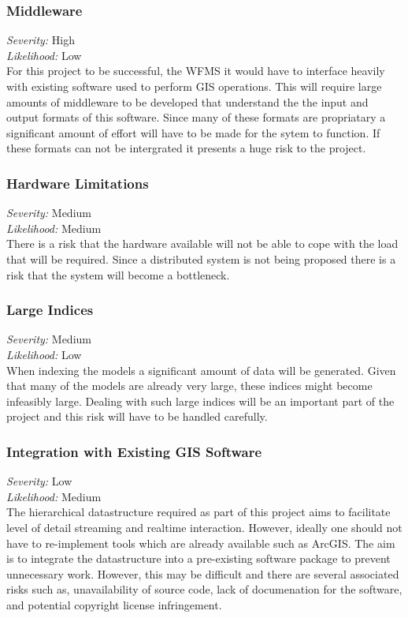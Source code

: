 \documentclass[12pt,a4paper]{article}
\begin{document}
\subsubsection*{Middleware}
\noindent \textit{Severity: } High \\
\noindent \textit{Likelihood: } Low \\
For this project to be successful, the WFMS it would have to interface
heavily with existing software used to perform GIS operations. This will
require large amounts of middleware to be developed that understand the
the input and output formats of this software. Since many of these
formats are propriatary a significant amount of effort will have to
be made for the sytem to function. If these formats can not be intergrated
it presents a huge risk to the project.
\subsubsection*{Hardware Limitations}
\noindent \textit{Severity: } Medium \\
\noindent \textit{Likelihood: } Medium \\
There is a risk that the hardware available will not be able to cope
with the load that will be required. Since a distributed system is
not being proposed there is a risk that the system will become a bottleneck.
\subsubsection*{Large Indices}
\noindent \textit{Severity: } Medium \\
\noindent \textit{Likelihood: } Low \\
When indexing the models a significant amount of data will be generated.
Given that many of the models are already very large, these indices might
become infeasibly large. Dealing with such large indices will be an important
part of the project and this risk will have to be handled carefully.
\subsubsection*{Integration with Existing GIS Software}
\noindent \textit{Severity: } Low \\
\noindent \textit{Likelihood: } Medium \\
The hierarchical datastructure required as part of this project aims to facilitate level
of detail streaming and realtime interaction. However, ideally one should not have to
re-implement tools which are already available such as ArcGIS. The aim is to integrate
the datastructure into a pre-existing software package to prevent unnecessary work.
However, this may be difficult and there are several associated risks such as,
unavailability of source code, lack of documenation for the software, and potential
copyright license infringement.
\end{document}
